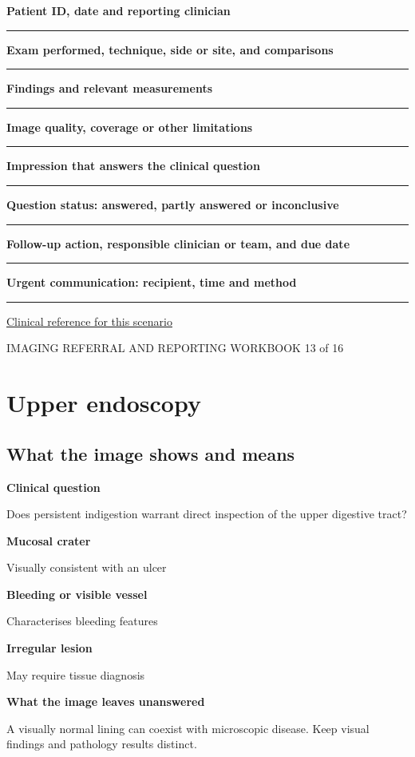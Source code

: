 \documentclass[11pt,a4paper]{article}
\newcommand{\record}[1]{\textbf{#1}\par\vspace{0.55\baselineskip}\hrule\vspace{0.35\baselineskip}}
\begin{document}
\record{Patient ID, date and reporting clinician}

\record{Exam performed, technique, side or site, and comparisons}

\record{Findings and relevant measurements}

\record{Image quality, coverage or other limitations}

\record{Impression that answers the clinical question}

\record{Question status: answered, partly answered or inconclusive}

\record{Follow-up action, responsible clinician or team, and due date}

\record{Urgent communication: recipient, time and method}

\small\href{https://gi.org/guideline/management-of-dyspepsia}{Clinical reference for this scenario}

\normalsize

\newpage

{\small IMAGING REFERRAL AND REPORTING WORKBOOK \hfill 13 of 16}

\section*{Upper endoscopy}

\subsection*{What the image shows and means}

\textbf{Clinical question}\par Does persistent indigestion warrant direct inspection of the upper digestive tract?\par

\textbf{Mucosal crater}\par Visually consistent with an ulcer\par

\textbf{Bleeding or visible vessel}\par Characterises bleeding features\par

\textbf{Irregular lesion}\par May require tissue diagnosis\par

\textbf{What the image leaves unanswered}\par A visually normal lining can coexist with microscopic disease. Keep visual findings and pathology results distinct.\par
\end{document}
